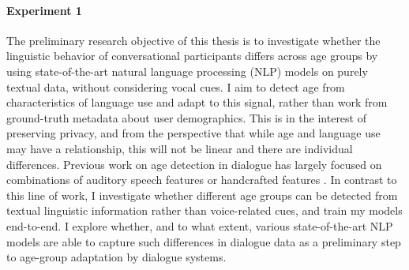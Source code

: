 \paragraph{Experiment 1} The preliminary research objective of this thesis is to investigate whether the linguistic behavior of conversational participants differs across age groups by using state-of-the-art natural language processing (NLP) models on purely textual data, without considering vocal cues.
I aim to detect age from characteristics of language use and adapt to this signal, rather than work from ground-truth metadata about user demographics.
This is in the interest of preserving privacy, and from the perspective that while age and language use may have a relationship, this will not be linear \citep{pennebaker2003words} and there are individual differences. 
Previous work on age detection in dialogue has largely focused on combinations of auditory speech features or handcrafted features \citep{schler2006effects, wolters2009age, li2013automatic}.
In contrast to this line of work, I investigate whether different age groups can be detected from textual linguistic information rather than voice-related cues, and train my models end-to-end. I explore whether, and to what extent, various state-of-the-art NLP models are able to capture such differences in dialogue data as a preliminary step to age-group adaptation by dialogue systems.


